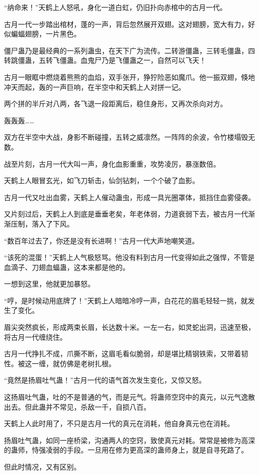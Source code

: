 \begin{this_body}
“纳命来！”天鹤上人怒吼，身化一道白虹，仍旧扑向赤棺中的古月一代。

古月一代一步踏出棺材，蓬的一声，背后忽然展开双翅。这对翅膀，宽大有力，好似蝙蝠翅膀，一片黑色。

僵尸蛊乃是最经典的一系列蛊虫，在天下广为流传。二转游僵蛊，三转毛僵蛊，四转跳僵蛊，五转飞僵蛊。血鬼尸乃是飞僵蛊之一，自然可以飞天！

古月一眼眶中燃烧着熊熊的血焰，双手张开，狰狞险恶如魔爪。他一振双翅，倏地冲天而起，轰的一声巨响，在半空中和天鹤上人对拼一记。

两个拼的半斤对八两，各飞退一段距离后，稳住身形，又再次杀向对方。

轰轰轰……

双方在半空中大战，身影不断碰撞，五转之威凛然。一阵阵的余波，令竹楼塌毁无数。

战至片刻，古月一代大叫一声，身化血影重重，攻势凌厉，暴涨数倍。

天鹤上人眼冒玄光，如飞刀斩击，仙剑钻刺，一个个破了血影。

古月一代又吐出血雾，天鹤上人催动蛊虫，形成一具光圈罩体，抵挡住血雾侵袭。

又片刻过后，天鹤上人到底是垂垂老矣，年老体弱，力道衰弱下去，被古月一代渐渐压制，落入了下风。

“数百年过去了，你还是没有长进啊！”古月一代大声地嘲笑道。

“该死的混蛋！”天鹤上人气极怒骂。他没有料到古月一代变得如此之强悍，不管是血滴子、刀翅血蝠蛊，这本来都是他的。

一想到这里，他就更加暴怒。

“哼，是时候动用底牌了！”天鹤上人暗暗冷哼一声，白花花的眉毛轻轻一挑，就发生了变化。

眉尖突然疯长，形成两束长眉，长达数十米。一左一右，如灵蛇出洞，迅速至极，将古月一代缠绕住。

古月一代挣扎不成，爪撕不断，这眉毛看似脆弱，却是堪比精钢铁索，又带着韧性。被这一缠，就仿佛是老树扎根。

“竟然是扬眉吐气蛊！”古月一代的语气首次发生变化，又惊又怒。

这扬眉吐气蛊，吐的不是普通的气，而是元气。将蛊师空窍中的真元，以元气逸散出去。但此蛊并不常见，杀敌一千，自损八百。

天鹤上人此时用了，不只是古月一代的真元在消耗，他自身真元也在消耗。

扬眉吐气蛊，如同一座桥梁，沟通两人的空窍，致使真元对耗。常常是被修为高深的蛊师，恃强凌弱的手段。一旦用在修为更高深的蛊师身上，就是自寻死路了。

但此时情况，又有区别。


\end{this_body}
